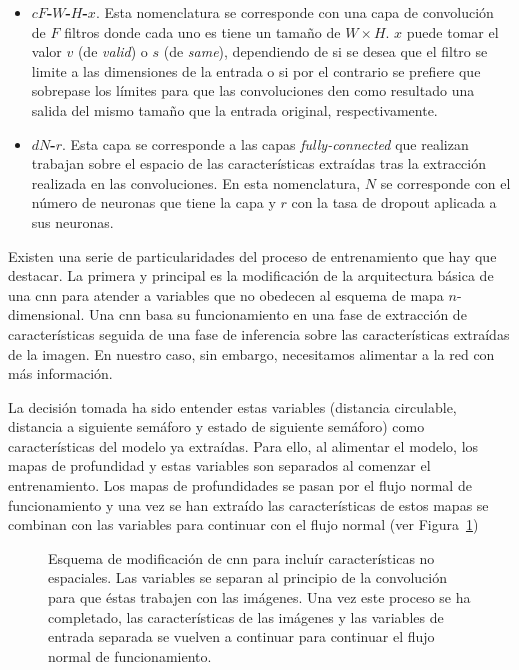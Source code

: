 \begin{itemize}
	\item \textbf{$cF$-$W$-$H$-$x$}. Esta nomenclatura se corresponde con una capa de convolución de $F$ filtros donde cada uno es tiene un tamaño de $W \times H$. $x$ puede tomar el valor $v$ (de \textit{valid}) o $s$ (de \textit{same}), dependiendo de si se desea que el filtro se limite a las dimensiones de la entrada o si por el contrario se prefiere que sobrepase los límites para que las convoluciones den como resultado una salida del mismo tamaño que la entrada original, respectivamente.
	\item \textbf{$dN$-$r$}. Esta capa se corresponde a las capas \textit{fully-connected} que realizan trabajan sobre el espacio de las características extraídas tras la extracción realizada en las convoluciones. En esta nomenclatura, $N$ se corresponde con el número de neuronas que tiene la capa y $r$ con la tasa de dropout aplicada a sus neuronas.
\end{itemize}

Existen una serie de particularidades del proceso de entrenamiento que hay que destacar. La primera y principal es la modificación de la arquitectura básica de una \ac{cnn} para atender a variables que no obedecen al esquema de mapa $n$-dimensional. Una \ac{cnn} basa su funcionamiento en una fase de extracción de características seguida de una fase de inferencia sobre las características extraídas de la imagen. En nuestro caso, sin embargo, necesitamos alimentar a la red con más información.

La decisión tomada ha sido entender estas variables (distancia circulable, distancia a siguiente semáforo y estado de siguiente semáforo) como características del modelo ya extraídas. Para ello, al alimentar el modelo, los mapas de profundidad y estas variables son separados al comenzar el entrenamiento. Los mapas de profundidades se pasan por el flujo normal de funcionamiento y una vez se han extraído las características de estos mapas se combinan con las variables para continuar con el flujo normal (ver Figura~\ref{fig:modification-of-cnn-to-work-with-variables})

\begin{figure}
	\centering
	\caption[Esquema de modificación de \ac{cnn} para incluír características no espaciales]{Esquema de modificación de \ac{cnn} para incluír características no espaciales. Las variables se separan al principio de la convolución para que éstas trabajen con las imágenes. Una vez este proceso se ha completado, las características de las imágenes y las variables de entrada separada se vuelven a continuar para continuar el flujo normal de funcionamiento.}
	\label{fig:modification-of-cnn-to-work-with-variables}
\end{figure}

